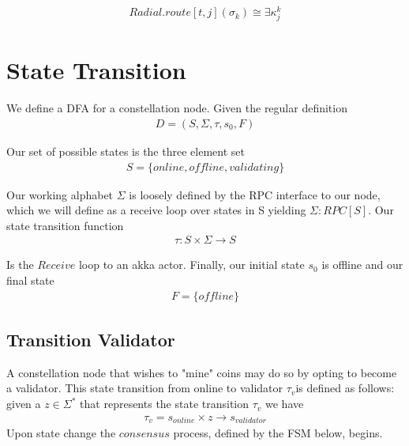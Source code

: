 \documentclass{article}
\begin{document}
\begin{equation} \label{eq1}
\begin{split}
Radial.route[t,j](\sigma_k) \cong \exists \kappa_j^{k}
\end{split}
\end{equation}

\section{State Transition}
We define a DFA for a constellation node. Given the regular definition
\begin{equation} \label{eq1}
\begin{split}
D = (S, \Sigma, \tau, s_0, F)
\end{split}
\end{equation}

Our set of possible states is the three element set
\begin{equation} \label{eq1}
\begin{split}
S = \{online, offline, validating\}
\end{split}
\end{equation}

Our working alphabet $\Sigma$ is loosely defined by the RPC interface to our node, which we will define as a receive loop over states in S yielding $\Sigma: RPC[S]$. Our state transition function
\begin{equation} \label{eq1}
\begin{split}
\tau: S \times \Sigma \rightarrow S
\end{split}
\end{equation}

Is the $Receive$ loop to an akka actor. Finally, our initial state $s_0$ is offline and our final state
\begin{equation} \label{eq1}
\begin{split}
F = \{offline\}
\end{split}
\end{equation}

\subsection{Transition Validator}
A constellation node that wishes to "mine" coins may do so by opting to become a validator. This state transition from online to validator $\tau_v$is defined as follows: given a $z \in \Sigma^{*}$ that represents the state transition $\tau_v$ we have
\begin{equation} \label{eq1}
\begin{split}
\tau_v = s_{online} \times z \rightarrow s_{validator}
\end{split}
\end{equation}
Upon state change the $consensus$ process, defined by the FSM below, begins.
\end{document}
